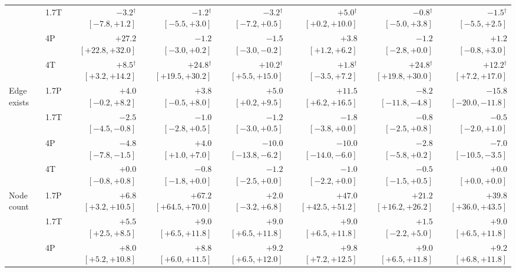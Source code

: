 \documentclass[11pt]{article}
\begin{document}
\begin{table}[t]
{\begin{tabular}{llrrrrrr}
 & 1.7T & $-3.2$$^\dagger$ {\tiny$[-7.8,+1.2]$} & $-1.2$$^\dagger$ {\tiny$[-5.5,+3.0]$} & $-3.2$$^\dagger$ {\tiny$[-7.2,+0.5]$} & $+5.0$$^\dagger$ {\tiny$[+0.2,+10.0]$} & $-0.8$$^\dagger$ {\tiny$[-5.0,+3.8]$} & $-1.5$$^\dagger$ {\tiny$[-5.5,+2.5]$}\\ %
 & 4P & $+27.2$ {\tiny$[+22.8,+32.0]$} & $-1.2$ {\tiny$[-3.0,+0.2]$} & $-1.5$ {\tiny$[-3.0,-0.2]$} & $+3.8$ {\tiny$[+1.2,+6.2]$} & $-1.2$ {\tiny$[-2.8,+0.0]$} & $+1.2$ {\tiny$[-0.8,+3.0]$}\\ %
 & 4T & $+8.5$$^\dagger$ {\tiny$[+3.2,+14.2]$} & $+24.8$$^\dagger$ {\tiny$[+19.5,+30.2]$} & $+10.2$$^\dagger$ {\tiny$[+5.5,+15.0]$} & $+1.8$$^\dagger$ {\tiny$[-3.5,+7.2]$} & $+24.8$$^\dagger$ {\tiny$[+19.8,+30.0]$} & $+12.2$$^\dagger$ {\tiny$[+7.2,+17.0]$}\\ %
\addlinespace[1pt]
Edge exists & 1.7P & $+4.0$ {\tiny$[-0.2,+8.2]$} & $+3.8$ {\tiny$[-0.5,+8.0]$} & $+5.0$ {\tiny$[+0.2,+9.5]$} & $+11.5$ {\tiny$[+6.2,+16.5]$} & $-8.2$ {\tiny$[-11.8,-4.8]$} & $-15.8$ {\tiny$[-20.0,-11.8]$}\\ %
 & 1.7T & $-2.5$ {\tiny$[-4.5,-0.8]$} & $-1.0$ {\tiny$[-2.8,+0.5]$} & $-1.2$ {\tiny$[-3.0,+0.5]$} & $-1.8$ {\tiny$[-3.8,+0.0]$} & $-0.8$ {\tiny$[-2.5,+0.8]$} & $-0.5$ {\tiny$[-2.0,+1.0]$}\\ %
 & 4P & $-4.8$ {\tiny$[-7.8,-1.5]$} & $+4.0$ {\tiny$[+1.0,+7.0]$} & $-10.0$ {\tiny$[-13.8,-6.2]$} & $-10.0$ {\tiny$[-14.0,-6.0]$} & $-2.8$ {\tiny$[-5.8,+0.2]$} & $-7.0$ {\tiny$[-10.5,-3.5]$}\\ %
 & 4T & $+0.0$ {\tiny$[-0.8,+0.8]$} & $-0.8$ {\tiny$[-1.8,+0.0]$} & $-1.2$ {\tiny$[-2.5,+0.0]$} & $-1.0$ {\tiny$[-2.2,+0.0]$} & $-0.5$ {\tiny$[-1.5,+0.5]$} & $+0.0$ {\tiny$[+0.0,+0.0]$}\\ %
\addlinespace[1pt]
Node count & 1.7P & $+6.8$ {\tiny$[+3.2,+10.5]$} & $+67.2$ {\tiny$[+64.5,+70.0]$} & $+2.0$ {\tiny$[-3.2,+6.8]$} & $+47.0$ {\tiny$[+42.5,+51.2]$} & $+21.2$ {\tiny$[+16.2,+26.2]$} & $+39.8$ {\tiny$[+36.0,+43.5]$}\\ %
 & 1.7T & $+5.5$ {\tiny$[+2.5,+8.5]$} & $+9.0$ {\tiny$[+6.5,+11.8]$} & $+9.0$ {\tiny$[+6.5,+11.8]$} & $+9.0$ {\tiny$[+6.5,+11.8]$} & $+1.5$ {\tiny$[-2.2,+5.0]$} & $+9.0$ {\tiny$[+6.5,+11.8]$}\\ %
 & 4P & $+8.0$ {\tiny$[+5.2,+10.8]$} & $+8.8$ {\tiny$[+6.0,+11.5]$} & $+9.2$ {\tiny$[+6.5,+12.0]$} & $+9.8$ {\tiny$[+7.2,+12.5]$} & $+9.0$ {\tiny$[+6.5,+11.8]$} & $+9.2$ {\tiny$[+6.8,+11.8]$}\\ %

\end{tabular}}
\end{table}
\end{document}
